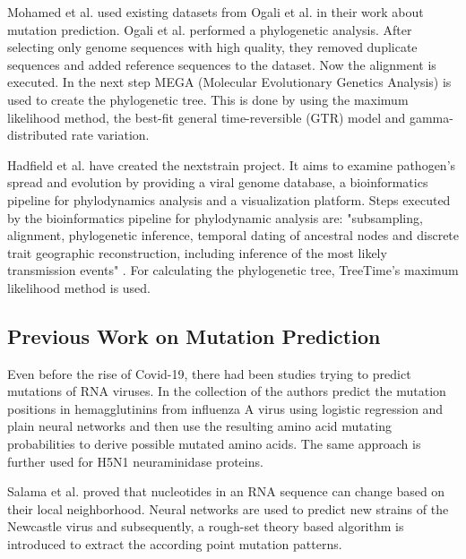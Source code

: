 Mohamed et al. \cite{Mohamed2021} used existing datasets from Ogali et al. \cite{ogaliMolecularCharacterizationNewcastle2018} in their work about mutation prediction. Ogali et al. \cite{ogaliMolecularCharacterizationNewcastle2018} performed a phylogenetic analysis. After selecting only genome sequences with high quality, they removed duplicate sequences and added reference sequences to the dataset. Now the alignment is executed. In the next step MEGA (Molecular Evo\-lu\-tio\-na\-ry Genetics Analysis) is used to create the phylogenetic tree. This is done by using the maximum likelihood method, the best-fit general time-reversible (GTR) model and gamma-distributed rate variation.

Hadfield et al. \cite{10.1093/bioinformatics/bty407} have created the nextstrain project. It aims to examine pathogen's spread and evolution by providing a viral genome database, a bioinformatics pipeline for phylodynamics analysis and a visualization plat\-form. Steps executed by the bioinformatics pipeline for phylodynamic analysis are: "subsampling, alignment, phylogenetic inference, temporal dating of ancestral nodes and discrete trait geographic reconstruction, including in\-fe\-rence of the most likely transmission events" \cite{10.1093/bioinformatics/bty407}. For calculating the phylogenetic tree, TreeTime's maximum likelihood method is used. \cite{10.1093/bioinformatics/bty407}

\subsection{Previous Work on Mutation Prediction} \label{fundamentalsE}

Even before the rise of Covid-19, there had been studies trying to predict mutations of \ac{RNA} viruses. In the collection of \cite{Yan2007, Wu2007, Wu2008} the authors predict the mutation positions in hemagglutinins from influenza A virus using logistic regression and plain neural networks and then use the resulting amino acid mutating probabilities to derive possible mutated amino acids. The same approach is further used for H5N1 neuraminidase proteins. 

Salama et al. \cite{Salama2016} proved that nucleotides in an \ac{RNA} sequence can change based on their local neighborhood. Neural networks are used to predict new strains of the Newcastle virus and subsequently, a rough-set theory based algorithm is introduced to extract the according point mutation patterns. 

